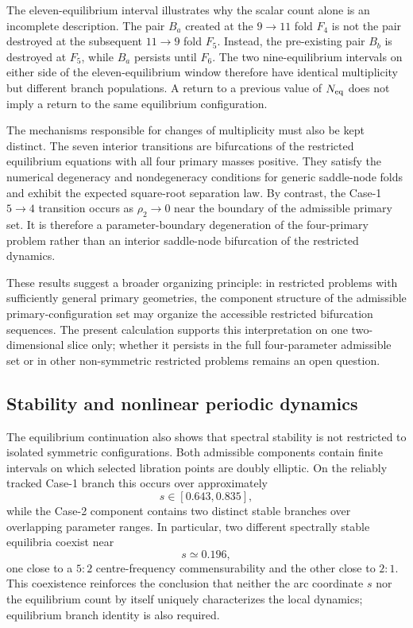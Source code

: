 The eleven-equilibrium interval illustrates why the scalar count alone is
an incomplete description. The pair $B_a$ created at the
$9\rightarrow11$ fold $F_4$ is not the pair destroyed at the subsequent
$11\rightarrow9$ fold $F_5$. Instead, the pre-existing pair $B_b$ is
destroyed at $F_5$, while $B_a$ persists until $F_6$. The two
nine-equilibrium intervals on either side of the eleven-equilibrium window
therefore have identical multiplicity but different branch populations.
A return to a previous value of $N_{\rm eq}$ does not imply a return to the
same equilibrium configuration.

The mechanisms responsible for changes of multiplicity must also be kept
distinct. The seven interior transitions are bifurcations of the restricted
equilibrium equations with all four primary masses positive. They satisfy
the numerical degeneracy and nondegeneracy conditions for generic
saddle-node folds and exhibit the expected square-root separation law.
By contrast, the Case-1 $5\rightarrow4$ transition occurs as
$\rho_2\rightarrow0$ near the boundary of the admissible primary set. It
is therefore a parameter-boundary degeneration of the four-primary problem
rather than an interior saddle-node bifurcation of the restricted dynamics.

These results suggest a broader organizing principle: in restricted
problems with sufficiently general primary geometries, the component
structure of the admissible primary-configuration set may organize the
accessible restricted bifurcation sequences. The present calculation
supports this interpretation on one two-dimensional slice only; whether it
persists in the full four-parameter admissible set or in other
non-symmetric restricted problems remains an open question.


\subsection{Stability and nonlinear periodic dynamics}
\label{subsec:discussion_dynamics}

The equilibrium continuation also shows that spectral stability is not
restricted to isolated symmetric configurations. Both admissible components
contain finite intervals on which selected libration points are
doubly elliptic. On the reliably tracked Case-1 branch this occurs over
approximately
\[
s\in[0.643,0.835],
\]
while the Case-2 component contains two distinct stable branches over
overlapping parameter ranges. In particular, two different spectrally
stable equilibria coexist near
\[
s\simeq0.196,
\]
one close to a $5{:}2$ centre-frequency commensurability and the other
close to $2{:}1$. This coexistence reinforces the conclusion that neither
the arc coordinate $s$ nor the equilibrium count by itself uniquely
characterizes the local dynamics; equilibrium branch identity is also
required.

